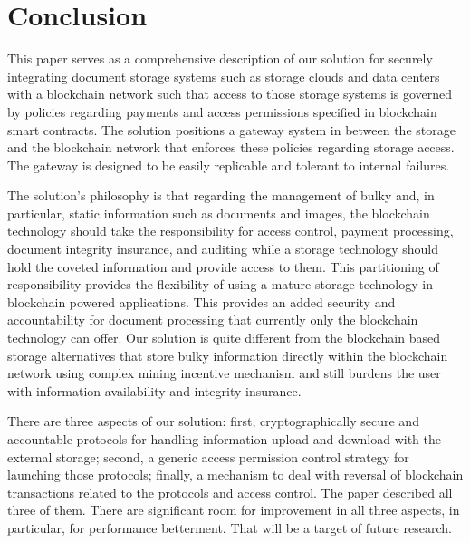
\section{Conclusion}
\label{s-con}
This paper serves as a comprehensive description of our solution for securely integrating document storage systems such as storage clouds and data centers with a blockchain network such that access to those storage systems is governed by policies regarding payments and access permissions specified in blockchain smart contracts. The solution positions a gateway system in between the storage and the blockchain network that enforces these policies regarding storage access. The gateway is designed to be easily replicable and tolerant to internal failures.

The solution's philosophy is that regarding the management of bulky and, in particular, static information such as documents and images, the blockchain technology should take the responsibility for access control, payment processing, document integrity insurance, and auditing while a storage technology should hold the coveted information and provide access to them. This partitioning of responsibility provides the flexibility of using a mature storage technology in blockchain powered applications. This provides an added security and accountability for document processing that currently only the blockchain technology can offer. Our solution is quite different from the blockchain based storage alternatives that store bulky information directly within the blockchain network using complex mining incentive mechanism and still burdens the user with information availability and integrity insurance.             

There are three aspects of our solution: first, cryptographically secure and accountable protocols for handling information upload and download with the external storage; second, a generic access permission control strategy for launching those protocols; finally, a mechanism to deal with reversal of blockchain transactions related to the protocols and access control. The paper described all three of them. There are significant room for improvement in all three aspects, in particular, for performance betterment. That will be a target of future research.         
 
